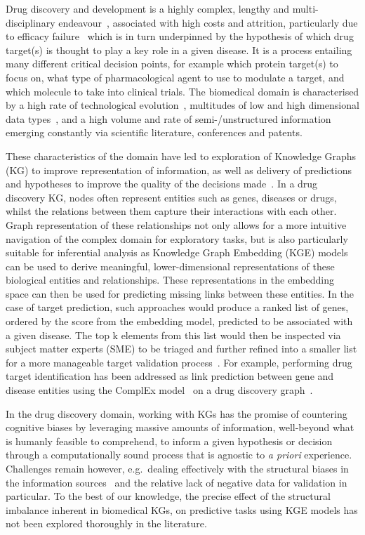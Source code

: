 Drug discovery and development is a highly complex, lengthy and multi-disciplinary endeavour~\cite{cook2014lessons}, associated with high costs and attrition, particularly due to efficacy failure~\cite{morgan2018impact} which is in turn underpinned by the hypothesis of which drug target(s) is thought to play a key role in a given disease. It is a process entailing many different critical decision points, for example which protein target(s) to focus on, what type of pharmacological agent to use to modulate a target, and which molecule to take into clinical trials. The biomedical domain is characterised by a high rate of technological evolution~\cite{goodwin2016coming, ran2013genome}, multitudes of low and high dimensional data types~\cite{ebrahim2016multi, hasin2017multi}, and a high volume and rate of semi-/unstructured information emerging constantly via scientific literature, conferences and patents.

These characteristics of the domain have led to exploration of Knowledge Graphs (KG) to improve representation of information, as well as delivery of predictions and hypotheses to improve the quality of the decisions made~\cite{bonner2021review, gaudelet2020utilising}. In a drug discovery KG, nodes often represent entities such as genes, diseases or drugs, whilst the relations between them capture their interactions with each other. Graph representation of these relationships not only allows for a more intuitive navigation of the complex domain for exploratory tasks, but is also particularly suitable for inferential analysis as Knowledge Graph Embedding (KGE) models can be used to derive meaningful, lower-dimensional representations of these biological entities and relationships. These representations in the embedding space can then be used for predicting missing links between these entities. In the case of target prediction, such approaches would produce a ranked list of genes, ordered by the score from the embedding model, predicted to be associated with a given disease. The top k elements from this list would then be inspected via subject matter experts (SME) to be triaged and further refined into a smaller list for a more manageable target validation process~\cite{paliwal2020preclinical}. For example, performing drug target identification has been addressed as link prediction between gene and disease entities using the ComplEx model~\cite{trouillon2016complex} on a drug discovery graph~\cite{paliwal2020preclinical}.

In the drug discovery domain, working with KGs has the promise of countering cognitive biases by leveraging massive amounts of information, well-beyond what is humanly feasible to comprehend, to inform a given hypothesis or decision through a computationally sound process that is agnostic to \emph{a priori} experience. Challenges remain however, e.g.\ dealing effectively with the structural biases in the information sources~\cite{nguyen2017pharos} and the relative lack of negative data for validation in particular. To the best of our knowledge, the precise effect of the structural imbalance inherent in biomedical KGs, on predictive tasks using KGE models has not been explored thoroughly in the literature.


